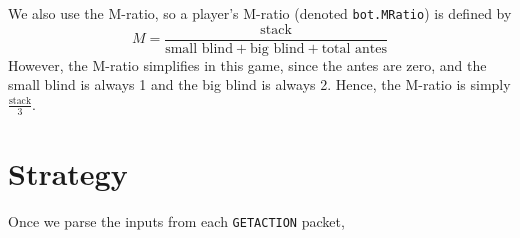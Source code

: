 \documentclass{article}
\begin{document}
We also use the M-ratio, so a player's M-ratio (denoted \texttt{bot.MRatio}) is defined by
\[ M = \frac{\text{stack}}{\text{small blind} + \text{big blind} + \text{total antes}} \]
However, the M-ratio simplifies in this game, since the antes are zero, and the small blind is always 1 and the big blind is always 2. Hence, the M-ratio is simply $\frac{\text{stack}}{3}$.

\section*{Strategy}
Once we parse the inputs from each \texttt{GETACTION} packet,
\end{document}
